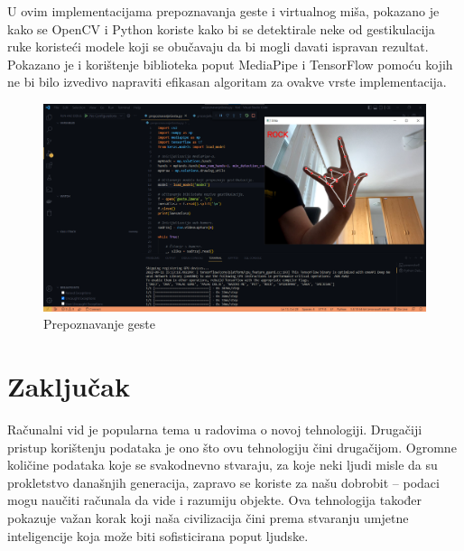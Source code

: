 \documentclass[]{foi} %
\begin{document}
\newpage
U ovim implementacijama prepoznavanja geste i virtualnog miša, pokazano je kako se OpenCV i Python koriste kako bi se detektirale neke od gestikulacija ruke koristeći modele koji se obučavaju da bi mogli davati ispravan rezultat. Pokazano je i korištenje biblioteka poput MediaPipe i TensorFlow pomoću kojih ne bi bilo izvedivo napraviti efikasan algoritam za ovakve vrste implementacija.

\begin{figure}[!ht]
    \centering
    \includegraphics[width=1\textwidth]{slike/rock.png}
    \caption{Prepoznavanje geste}
    \label{fig:rock}
\end{figure}

\chapter{Zaključak}

Računalni vid je popularna tema u radovima o novoj tehnologiji. Drugačiji pristup korištenju podataka je ono što ovu tehnologiju čini drugačijom. Ogromne količine podataka koje se svakodnevno stvaraju, za koje neki ljudi misle da su prokletstvo današnjih generacija, zapravo se koriste za našu dobrobit -- podaci mogu naučiti računala da vide i razumiju objekte. Ova tehnologija također pokazuje važan korak koji naša civilizacija čini prema stvaranju umjetne inteligencije koja može biti sofisticirana poput ljudske.
\end{document}
